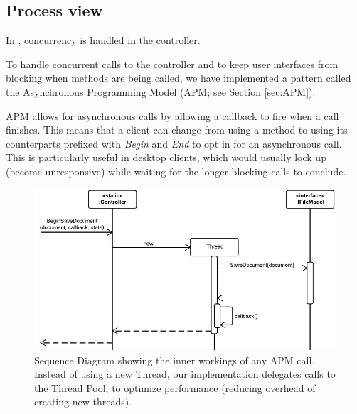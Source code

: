 \subsection{Process view}

In \SOP{}, concurrency is handled in the controller.

To handle concurrent calls to the controller and to keep user interfaces from blocking when methods
are being called, we have implemented a pattern called the Asynchronous Programming Model (APM; see
Section \ref{sec:APM}).

APM allows for asynchronous calls by allowing a callback to fire when a call finishes. This means that
a client can change from using a method to using its counterparts prefixed with \emph{Begin} and
\emph{End} to opt in for an asynchronous call. This is particularly useful in desktop clients, which
would usually lock up (become unresponsive) while waiting for the longer blocking calls to conclude.

\begin{figure}[htb]
	\centering
	\includegraphics[width=1\textwidth]{Software_architecture/graphics/apm-sequence.png}
	\caption{Sequence Diagram showing the inner workings of any APM call. Instead of using a new Thread, our implementation
        delegates calls to the Thread Pool, to optimize performance (reducing overhead of creating new threads).}
	\label{fig:apm-sequence}
\end{figure}